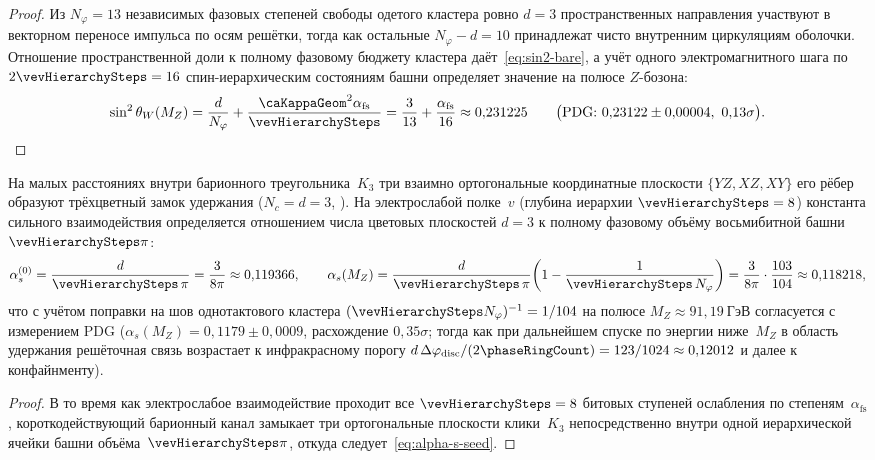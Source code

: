\begin{proof}
Из $N_\varphi = 13$ независимых фазовых степеней свободы одетого кластера ровно $d=3$ пространственных направления участвуют в векторном переносе импульса по осям решётки, тогда как остальные $N_\varphi - d = 10$ принадлежат чисто внутренним циркуляциям оболочки.
Отношение пространственной доли к полному фазовому бюджету кластера даёт~\eqref{eq:sin2-bare}, а учёт одного электромагнитного шага по $2\vevHierarchySteps = 16$ спин-иерархическим состояниям башни определяет значение на полюсе $Z$-бозона:
\[
  \sin^2\theta_W(M_Z) = \frac{d}{N_\varphi} + \frac{\caKappaGeom^2\alpha_{\mathrm{fs}}}{\vevHierarchySteps} = \frac{3}{13} + \frac{\alpha_{\mathrm{fs}}}{16} \approx 0{,}231225
  \qquad\bigl(\text{PDG: }0{,}23122\pm 0{,}00004,\ 0{,}13\sigma\bigr).
\]
\end{proof}

\begin{proposition}
\label{prop:alpha-s-seed}
На малых расстояниях внутри барионного треугольника~$K_3$ три взаимно ортогональные координатные плоскости $\{YZ,XZ,XY\}$ его рёбер образуют трёхцветный замок удержания ($N_c = d = 3$, ).
На электрослабой полке~$v$ (глубина иерархии $\vevHierarchySteps = 8$) константа сильного взаимодействия определяется отношением числа цветовых плоскостей $d=3$ к полному фазовому объёму восьмибитной башни $\vevHierarchySteps\pi$:
\begin{equation}
\label{eq:alpha-s-seed}
  \alpha_s^{(0)} = \frac{d}{\vevHierarchySteps\,\pi} = \frac{3}{8\pi} \approx 0{,}119366,
  \qquad
  \alpha_s(M_Z) = \frac{d}{\vevHierarchySteps\,\pi}\!\left(1 - \frac{1}{\vevHierarchySteps\,N_\varphi}\right)
  = \frac{3}{8\pi}\cdot\frac{103}{104} \approx 0{,}118218,
\end{equation}
что с учётом поправки на шов однотактового кластера $(\vevHierarchySteps N_\varphi)^{-1} = 1/104$ на полюсе $M_Z\approx 91{,}19\ \mathrm{ГэВ}$ согласуется с измерением PDG ($\alpha_s(M_Z) = 0{,}1179\pm 0{,}0009$, расхождение $0{,}35\sigma$; тогда как при дальнейшем спуске по энергии ниже~$M_Z$ в область удержания решёточная связь возрастает к инфракрасному порогу $d\,\Delta\varphi_{\mathrm{disc}}/(2\phaseRingCount) = 123/1024 \approx 0{,}12012$ и далее к конфайнменту).
\end{proposition}

\begin{proof}
В то время как электрослабое взаимодействие проходит все $\vevHierarchySteps = 8$ битовых ступеней ослабления по степеням~$\alpha_{\mathrm{fs}}$, короткодействующий барионный канал замыкает три ортогональные плоскости клики~$K_3$ непосредственно внутри одной иерархической ячейки башни объёма~$\vevHierarchySteps\pi$, откуда следует~\eqref{eq:alpha-s-seed}.
\end{proof}

